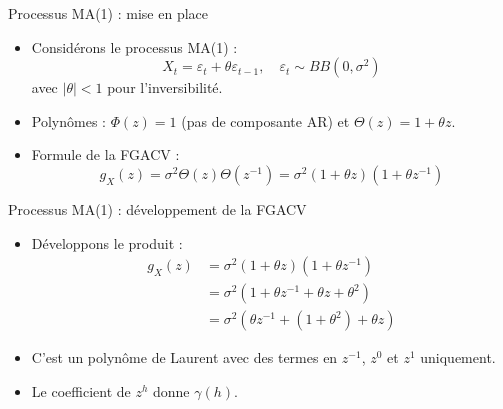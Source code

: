 \documentclass[11pt,aspectratio=169]{beamer}
\begin{document}
\begin{frame}{Processus MA(1) : mise en place}

\begin{itemize}

\item Considérons le processus MA(1) :
  \[
  X_t = \varepsilon_t + \theta \varepsilon_{t-1}, \quad \varepsilon_t \sim BB(0, \sigma^2)
  \]
  avec $|\theta| < 1$ pour l'inversibilité.\newline

\item Polynômes : $\Phi(z) = 1$ (pas de composante AR) et $\Theta(z) = 1 + \theta z$.\newline

\item Formule de la FGACV :
  \[
  g_X(z) = \sigma^2 \Theta(z)\Theta(z^{-1}) = \sigma^2 (1 + \theta z)(1 + \theta z^{-1})
  \]

\end{itemize}

\end{frame}

\begin{frame}{Processus MA(1) : développement de la FGACV}

\begin{itemize}

\item Développons le produit :
  \begin{align*}
  g_X(z) &= \sigma^2 (1 + \theta z)(1 + \theta z^{-1}) \\
  &= \sigma^2 \left( 1 + \theta z^{-1} + \theta z + \theta^2 \right) \\
  &= \sigma^2 \left( \theta z^{-1} + (1 + \theta^2) + \theta z \right)
  \end{align*}\newline

\item C'est un polynôme de Laurent avec des termes en $z^{-1}$, $z^0$ et $z^1$ uniquement.\newline

\item Le coefficient de $z^h$ donne $\gamma(h)$.

\end{itemize}

\end{frame}
\end{document}
